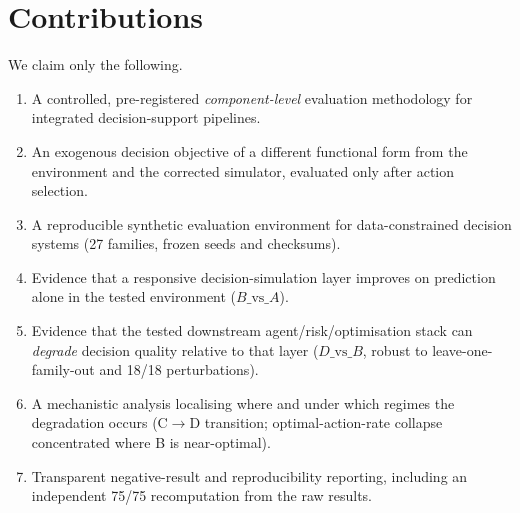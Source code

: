 \documentclass[conference]{IEEEtran}
\begin{document}
\section{Contributions}\label{sec:contrib}
We claim only the following.
\begin{enumerate}
  \item A controlled, pre-registered \emph{component-level} evaluation
        methodology for integrated decision-support pipelines.
  \item An exogenous decision objective of a different functional form from the
        environment and the corrected simulator, evaluated only after action
        selection.
  \item A reproducible synthetic evaluation environment for data-constrained
        decision systems (27 families, frozen seeds and checksums).
  \item Evidence that a responsive decision-simulation layer improves on
        prediction alone in the tested environment ($B\text{\_vs\_}A$).
  \item Evidence that the tested downstream agent/risk/optimisation stack can
        \emph{degrade} decision quality relative to that layer
        ($D\text{\_vs\_}B$, robust to leave-one-family-out and 18/18
        perturbations).
  \item A mechanistic analysis localising where and under which regimes the
        degradation occurs (C$\to$D transition; optimal-action-rate collapse
        concentrated where B is near-optimal).
  \item Transparent negative-result and reproducibility reporting, including an
        independent 75/75 recomputation from the raw results.
\end{enumerate}

\end{document}
